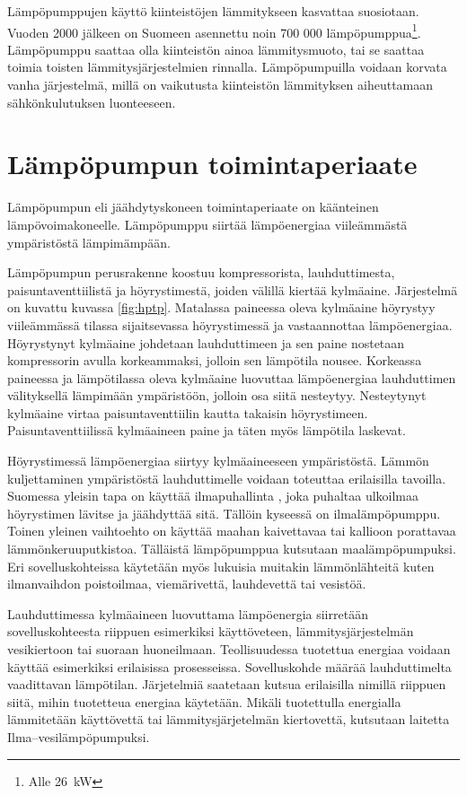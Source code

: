 Lämpöpumppujen käyttö kiinteistöjen lämmitykseen kasvattaa suosiotaan. Vuoden 2000 jälkeen on Suomeen asennettu noin 700 000 lämpöpumppua\footnote{Alle \SI{26}{\kilo\watt}}\parencite{kummu}. Lämpöpumppu saattaa olla kiinteistön ainoa lämmitysmuoto, tai se saattaa toimia toisten lämmitysjärjestelmien rinnalla. Lämpöpumpuilla voidaan korvata vanha järjestelmä, millä on vaikutusta kiinteistön lämmityksen aiheuttamaan sähkönkulutuksen luonteeseen.

\section{Lämpöpumpun toimintaperiaate}
  Lämpöpumpun eli jäähdytyskoneen toimintaperiaate on käänteinen lämpövoimakoneelle. Lämpöpumppu siirtää lämpöenergiaa viileämmästä ympäristöstä lämpimämpään.\parencite{DincerRosen}

  Lämpöpumpun perusrakenne koostuu kompressorista, lauhduttimesta, paisuntaventtiilistä ja höyrystimestä, joiden välillä kiertää kylmäaine. Järjestelmä on kuvattu kuvassa \ref{fig:hptp}. Matalassa paineessa oleva kylmäaine höyrystyy viileämmässä tilassa sijaitsevassa höyrystimessä ja vastaannottaa lämpöenergiaa. Höyrystynyt kylmäaine johdetaan lauhduttimeen ja sen paine nostetaan kompressorin avulla korkeammaksi, jolloin sen lämpötila nousee. Korkeassa paineessa ja lämpötilassa oleva kylmäaine luovuttaa lämpöenergiaa lauhduttimen välityksellä lämpimään ympäristöön, jolloin osa siitä nesteytyy. Nesteytynyt kylmäaine virtaa paisuntaventtiilin kautta takaisin höyrystimeen. Paisuntaventtiilissä kylmäaineen paine ja täten myös lämpötila laskevat.\parencite{DincerRosen}

  Höyrystimessä lämpöenergiaa siirtyy kylmäaineeseen ympäristöstä. Lämmön kuljettaminen ympäristöstä lauhduttimelle voidaan toteuttaa erilaisilla tavoilla. Suomessa yleisin tapa on käyttää ilmapuhallinta \parencite{Lahde}, joka puhaltaa ulkoilmaa höyrystimen lävitse ja jäähdyttää sitä. Tällöin kyseessä on ilmalämpöpumppu. Toinen yleinen vaihtoehto on käyttää maahan kaivettavaa tai kallioon porattavaa lämmönkeruuputkistoa. Tälläistä lämpöpumppua kutsutaan maalämpöpumpuksi. Eri sovelluskohteissa käytetään myös lukuisia muitakin lämmönlähteitä kuten ilmanvaihdon poistoilmaa, viemärivettä, lauhdevettä tai vesistöä.\parencite{DincerRosen, Lahde}

  Lauhduttimessa kylmäaineen luovuttama lämpöenergia siirretään sovelluskohteesta riippuen esimerkiksi käyttöveteen, lämmitysjärjestelmän vesikiertoon tai suoraan huoneilmaan. Teollisuudessa tuotettua energiaa voidaan käyttää esimerkiksi erilaisissa prosesseissa\parencite{Setala}. Sovelluskohde määrää lauhduttimelta vaadittavan lämpötilan. Järjetelmiä saatetaan kutsua erilaisilla nimillä riippuen siitä, mihin tuotetteua energiaa käytetään. Mikäli tuotettulla energialla lämmitetään käyttövettä tai lämmitysjärjetelmän kiertovettä, kutsutaan laitetta Ilma--vesilämpöpumpuksi.\parencite{Lahde}

